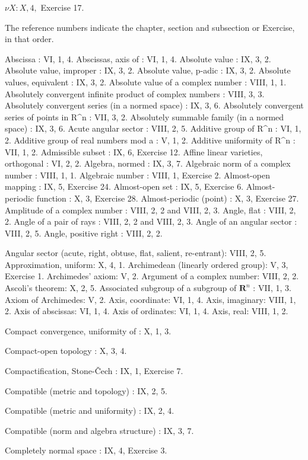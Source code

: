 \(\nu X:X,4,\) Exercise 17.

The reference numbers indicate the chapter, section and subsection or Exercise, in that order.

Abscissa : VI, 1, 4. Abscissas, axis of : VI, 1, 4. Absolute value : IX, 3, 2. Absolute value, improper : IX, 3, 2. Absolute value, p-adic : IX, 3, 2. Absolute values, equivalent : IX, 3, 2. Absolute value of a complex number : VIII, 1, 1. Absolutely convergent infinite product of complex numbers : VIII, 3, 3. Absolutely convergent series (in a normed space) : IX, 3, 6. Absolutely convergent series of points in R\^{}n : VII, 3, 2. Absolutely summable family (in a normed space) : IX, 3, 6. Acute angular sector : VIII, 2, 5. Additive group of R\^{}n : VI, 1, 2. Additive group of real numbers mod a : V, 1, 2. Additive uniformity of R\^{}n : VII, 1, 2. Admissible subset : IX, 6, Exercise 12. Affine linear varieties, orthogonal : VI, 2, 2. Algebra, normed : IX, 3, 7. Algebraic norm of a complex number : VIII, 1, 1. Algebraic number : VIII, 1, Exercise 2. Almost-open mapping : IX, 5, Exercise 24. Almost-open set : IX, 5, Exercise 6. Almost-periodic function : X, 3, Exercise 28. Almost-periodic (point) : X, 3, Exercise 27. Amplitude of a complex number : VIII, 2, 2 and VIII, 2, 3. Angle, flat : VIII, 2, 2. Angle of a pair of rays : VIII, 2, 2 and VIII, 2, 3. Angle of an angular sector : VIII, 2, 5. Angle, positive right : VIII, 2, 2.

Angular sector (acute, right, obtuse, flat, salient, re-entrant): VIII, 2, 5. Approximation, uniform: X, 4, 1. Archimedean (linearly ordered group): V, 3, Exercise 1. Archimedes' axiom: V, 2. Argument of a complex number: VIII, 2, 2. Ascoli's theorem: X, 2, 5. Associated subgroup of a subgroup of \(\mathbf{R}^n\) : VII, 1, 3. Axiom of Archimedes: V, 2. Axis, coordinate: VI, 1, 4. Axis, imaginary: VIII, 1, 2. Axis of abscissas: VI, 1, 4. Axis of ordinates: VI, 1, 4. Axis, real: VIII, 1, 2.

Compact convergence, uniformity of : X, 1, 3.

Compact-open topology : X, 3, 4.

Compactification, Stone-Čech : IX, 1, Exercise 7.

Compatible (metric and topology) : IX, 2, 5.

Compatible (metric and uniformity) : IX, 2, 4.

Compatible (norm and algebra structure) : IX, 3, 7.

Completely normal space : IX, 4, Exercise 3.

